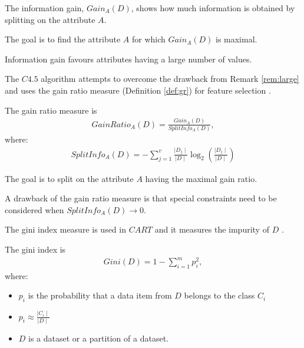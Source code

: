 \begin{remark}
The information gain, $Gain_{A}(D)$, shows how much information is obtained by splitting on the attribute $A$.
\end{remark}

\begin{remark}
The goal is to find the attribute $A$ for which $Gain_{A}(D)$ is maximal.
\end{remark}

\begin{remark}
\label{rem:large}
Information gain favours attributes having a large number of values.
\end{remark}

The $C4.5$ algorithm attempts to overcome the drawback from Remark \ref{rem:large} and uses the gain ratio measure (Definition \ref{def:gr}) for feature selection \cite{Han06DataMining}.

\begin{definition}
\label{def:gr}
The gain ratio measure is
\begin{align}
GainRatio_{A} (D) = \frac{Gain_{A}(D)}{SplitInfo_{A}(D)},
\end{align}
where:
\begin{align}
SplitInfo_{A}(D)= - \sum_{j=1}^{v} \frac{\mid D_{j} \mid}{\mid D \mid} \log_{2}(\frac{\mid D_{j} \mid}{\mid D \mid})
\end{align}
\end{definition}

\begin{remark}
The goal is to split on the attribute $A$ having the maximal gain ratio.
\end{remark}

\begin{remark}
A drawback of the gain ratio measure is that special constraints need to be considered when $SplitInfo_{A}(D) \rightarrow 0$.
\end{remark}

The gini index measure is used in $CART$ and it measures the impurity of $D$ \cite{Han06DataMining}.

\begin{definition}
The gini index is
\begin{align}
	Gini(D)=1-\sum_{i=1}^{m}p_{i}^{2},
\end{align}
where:
\begin{itemize}
\item $p_{i}$ is the probability that a data item from $D$ belongs to the class $C_{i}$
\item $p_{i} \approx \frac{\mid C_{i} \mid}{\mid D \mid}$
\item $D$ is a dataset or a partition of a dataset.
\end{itemize}
\end{definition}

